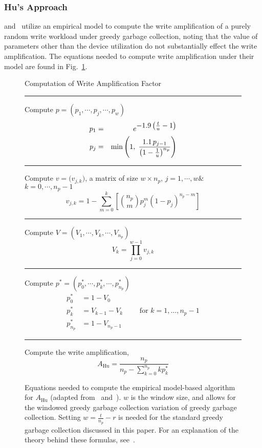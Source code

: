 \documentclass[prodmode,acmtos]{acmsmall}
\begin{document}
\subsubsection{Hu's Approach}
 and~ utilize an empirical model to compute the write amplification of a purely random write workload under greedy garbage collection, noting that the value of parameters other than the device utilization do not substantially effect the write amplification.  The equations needed to compute write amplification under their model are found in Fig.~\ref{eqn:fig_Hu}.

\begin{figure}[t!]
\begin{framed}
Computation of Write Amplification Factor
\medskip
\hrule \vspace{8pt}
Compute $p = (p_1, \cdots, p_j, \cdots, p_w)$
\begin{eqnarray}
p_1 &=& e^{\text{\normalsize$-1.9\left(\frac{t}{u}-1\right)$}} \label{eqn:Hu_needs_modify} \\
p_j &=& \text{min}\left(1, \; \frac{1.1 \, p_{j-1}}{ \left(1-\frac{1}{u}\right)^{n_p}} \right) \label{eqn:Hu_needs_modify2}
\end{eqnarray}
\hrule \vspace{8pt}
Compute $v = \big(v_{j,k}\big)$, a matrix of size $w \times n_p$, \newline \phantom{1} \hspace{10.2mm} $j= 1, \cdots, w$\quad \& \ \  $k= 0, \cdots, n_p-1$
\begin{equation*}
v_{j,k} = 1 - \sum_{m=0}^{k}\left[{n_p \choose m} p_j^m \left(1-p_j\right)^{n_p-m}\right]
\end{equation*}
\hrule \vspace{8pt}
Compute $V = (V_1, \cdots, V_k, \cdots, V_{n_p})$
\begin{equation*}
V_{k} = \prod_{j=0}^{w-1}v_{j,k}
\end{equation*}
\hrule \vspace{8pt}
Compute $p^* = (p^*_0, \cdots, p^*_k, \cdots, p^*_{n_p})$
\begin{align*}
p_0^* &= 1-V_{0} \\
p_k^* &= V_{k-1} - V_{k}  \qquad  \text{ for } k=1, \ldots, n_p-1 \\
p_{n_p}^* &= 1-V_{n_p-1}
\end{align*}
\hrule \vspace{8pt}
Compute the write amplification,
\begin{equation}\label{eqn:Hu_write_amp}
A_\text{Hu} = \frac{n_p}{n_p-\sum_{k=0}^{n_p} kp_k^*}
\end{equation}
\end{framed}
\caption{Equations needed to compute the empirical model-based algorithm for $A_\text{Hu}$ (adapted from~\cite{Hu2009,hu2010fundamental} and~\cite{frankie2012_ciit}).  $w$ is the window size, and allows for the windowed greedy garbage collection variation of greedy garbage collection.  Setting $w=\frac{t}{n_p}-r$ is needed for the standard greedy garbage collection discussed in this paper.  For an explanation of the theory behind these formulas, see~\cite{Hu2009,hu2010fundamental}.}
\label{eqn:fig_Hu}
\end{figure}
\end{document}
